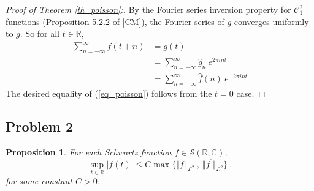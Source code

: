 \documentclass[12pt, reqno]{article}
\newtheorem{prop}{Proposition}[section]
\theoremstyle{definition}
\theoremstyle{remark}
\begin{document}
\begin{itemize}
\begin{proof}[Proof of Theorem \ref{th_poisson}:]
    By the Fourier series inversion property for $\mathcal{C}^{2}_{1}$ functions (Proposition 5.2.2 of [CM]), the Fourier series of $g$ converges uniformly to $g$. So for all $t\in \mathbb{R}$,
\begin{align*}
\sum_{n=-\infty}^{\infty}f(t+n)&= g(t)\\
&= \sum_{n=-\infty}^{\infty}\hat g_{n}~e^{2\pi int}\\
&= \sum_{n=-\infty}^{\infty}\widehat f(n)~e^{-2\pi int}
\end{align*}
The desired equality of (\ref{eq_poisson}) follows from the $t=0$ case.


\end{proof}


\end{itemize}


\vspace{0.2 cm}
\subsection*{Problem 2} 

\begin{prop}
    For each Schwartz function $f\in\mathcal{S}(\mathbb{R;C})$, 
    \begin{equation} \label{eq_sob}
        \sup_{t \in \mathbb{R}} \vert f(t) \vert \leq C \max \{ \Vert f \Vert_{\mathcal{L}^2} ~,~ \Vert f^\prime \Vert_{\mathcal{L}^2} \} ~\mbox{.}
    \end{equation}
    for some constant $C>0$.
\end{prop}
\end{document}
